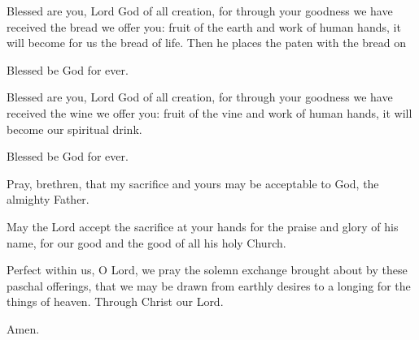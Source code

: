 \pr Blessed are you, Lord God of all creation, for through your goodness we have received the bread we offer you: fruit of the earth and work of human hands, it will become for us the bread of life. Then he places the paten with the bread on

\be Blessed be God for ever.

\pr Blessed are you, Lord God of all creation, for through your goodness we have received the wine we offer you: fruit of the vine and work of human hands, it will become our spiritual drink.

\be Blessed be God for ever.

\pr Pray, brethren, that my sacrifice and yours may be acceptable to God, the almighty Father.

\be May the Lord accept the sacrifice at your hands for the praise and glory of his name, for our good and the good of all his holy Church.

\pr Perfect within us, O Lord, we pray the solemn exchange brought about by these paschal offerings, that we may be drawn from earthly desires to a longing for the things of heaven. Through Christ our Lord.

\be Amen.